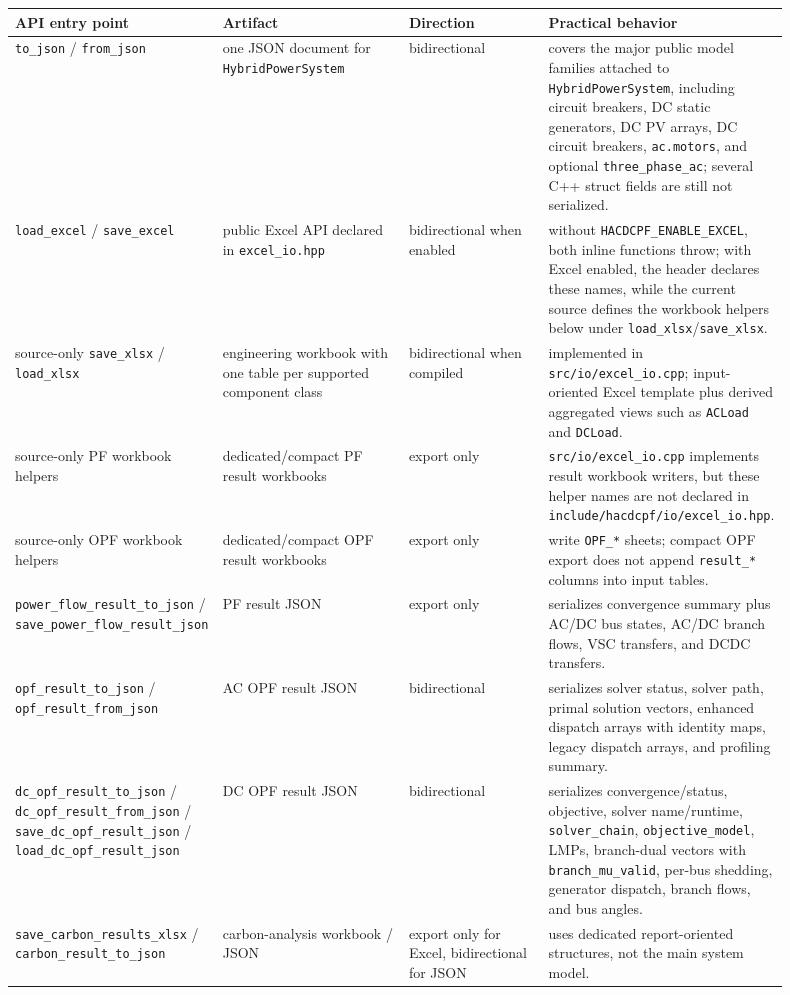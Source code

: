 \begin{longtable}{L{0.20\linewidth}L{0.24\linewidth}L{0.18\linewidth}L{0.28\linewidth}}
\toprule
API entry point & Artifact & Direction & Practical behavior \\
\midrule
\endhead
\texttt{to\_json} / \texttt{from\_json} & one JSON document for \texttt{HybridPowerSystem} & bidirectional & covers the major public model families attached to \texttt{HybridPowerSystem}, including circuit breakers, DC static generators, DC PV arrays, DC circuit breakers, \texttt{ac.motors}, and optional \texttt{three\_phase\_ac}; several C++ struct fields are still not serialized. \\
\texttt{load\_excel} / \texttt{save\_excel} & public Excel API declared in \texttt{excel\_io.hpp} & bidirectional when enabled & without \texttt{HACDCPF\_ENABLE\_EXCEL}, both inline functions throw; with Excel enabled, the header declares these names, while the current source defines the workbook helpers below under \texttt{load\_xlsx}/\texttt{save\_xlsx}. \\
source-only \texttt{save\_xlsx} / \texttt{load\_xlsx} & engineering workbook with one table per supported component class & bidirectional when compiled & implemented in \texttt{src/io/excel\_io.cpp}; input-oriented Excel template plus derived aggregated views such as \texttt{ACLoad} and \texttt{DCLoad}. \\
source-only PF workbook helpers & dedicated/compact PF result workbooks & export only & \texttt{src/io/excel\_io.cpp} implements result workbook writers, but these helper names are not declared in \texttt{include/hacdcpf/io/excel\_io.hpp}. \\
source-only OPF workbook helpers & dedicated/compact OPF result workbooks & export only & write \texttt{OPF\_*} sheets; compact OPF export does not append \texttt{result\_*} columns into input tables. \\
\texttt{power\_flow\_result\_to\_json} / \texttt{save\_power\_flow\_result\_json} & PF result JSON & export only & serializes convergence summary plus AC/DC bus states, AC/DC branch flows, VSC transfers, and DCDC transfers. \\
\texttt{opf\_result\_to\_json} / \texttt{opf\_result\_from\_json} & AC OPF result JSON & bidirectional & serializes solver status, solver path, primal solution vectors, enhanced dispatch arrays with identity maps, legacy dispatch arrays, and profiling summary. \\
\texttt{dc\_opf\_result\_to\_json} / \texttt{dc\_opf\_result\_from\_json} / \texttt{save\_dc\_opf\_result\_json} / \texttt{load\_dc\_opf\_result\_json} & DC OPF result JSON & bidirectional & serializes convergence/status, objective, solver name/runtime, \texttt{solver\_chain}, \texttt{objective\_model}, LMPs, branch-dual vectors with \texttt{branch\_mu\_valid}, per-bus shedding, generator dispatch, branch flows, and bus angles. \\
\texttt{save\_carbon\_results\_xlsx} / \texttt{carbon\_result\_to\_json} & carbon-analysis workbook / JSON & export only for Excel, bidirectional for JSON & uses dedicated report-oriented structures, not the main system model. \\
\bottomrule
\end{longtable}

